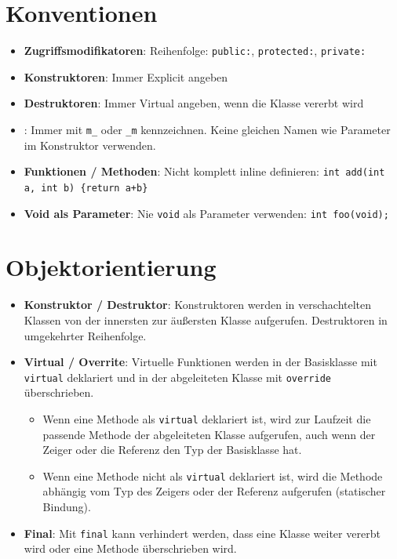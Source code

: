\documentclass[9pt, a3paper, landscape]{article}
\newcommand{\datastruct}[1]{\textbf{\textcolor{red!60!black}{#1}}}
\begin{document}
\begin{multicols*}{4}
\section{Konventionen}

\begin{itemize}
\item \datastruct{Zugriffsmodifikatoren}: Reihenfolge: \lstinline|public:|, \lstinline|protected:|, \lstinline|private:|
\item \datastruct{Konstruktoren}: Immer Explicit angeben 
\item \datastruct{Destruktoren}: Immer Virtual angeben, wenn die Klasse vererbt wird
\item {}: Immer mit \lstinline|m_| oder \lstinline|_m| kennzeichnen. Keine gleichen Namen wie Parameter im Konstruktor verwenden.
\item \datastruct{Funktionen / Methoden}: Nicht komplett inline definieren: \lstinline|int add(int a, int b) {return a+b}|
\item \datastruct{Void als Parameter}: Nie \lstinline|void| als Parameter verwenden: \lstinline|int foo(void);|
\end{itemize}

\section{Objektorientierung}

\begin{itemize}
   \item \datastruct{Konstruktor / Destruktor}: Konstruktoren werden in verschachtelten Klassen von der innersten zur äußersten Klasse aufgerufen. Destruktoren in umgekehrter Reihenfolge.
   \item \datastruct{Virtual / Overrite}: Virtuelle Funktionen werden in der Basisklasse mit \lstinline|virtual| deklariert und in der abgeleiteten Klasse mit \lstinline|override| überschrieben.
   \begin{itemize}
        \item Wenn eine Methode als \lstinline|virtual| deklariert ist, wird zur Laufzeit die passende Methode der abgeleiteten Klasse aufgerufen, auch wenn der Zeiger oder die Referenz den Typ der Basisklasse hat.
        \item Wenn eine Methode nicht als \lstinline|virtual| deklariert ist, wird die Methode abhängig vom Typ des Zeigers oder der Referenz aufgerufen (statischer Bindung).
   \end{itemize}
   \item \datastruct{Final}: Mit \lstinline|final| kann verhindert werden, dass eine Klasse weiter vererbt wird oder eine Methode überschrieben wird.
\end{itemize}


\end{multicols*}
\end{document}
